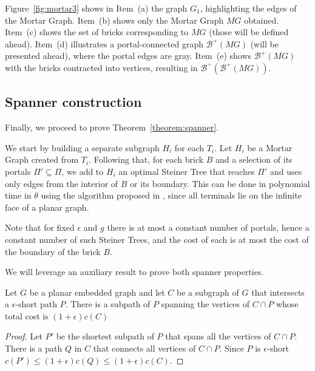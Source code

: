 Figure~\ref{fig:mortar3} shows in Item~(a) the graph \(G_1\), highlighting the edges of the Mortar Graph. 
Item~(b) shows only the Mortar Graph \(MG\) obtained. 
Item~(c) shows the set of bricks corresponding to \(MG\) (those will be defined ahead). 
Item~(d) illustrates a portal-connected graph \(\mathcal{B}^{+}(MG)\) (will be presented ahead), where the portal edges are gray. 
Item~(e) shows \(\mathcal{\mathcal{B}}^{+}(MG)\) with the bricks contracted into vertices, resulting in \(\mathcal{B}^{\div}(\mathcal{B }^{+}(MG))\).

\subsection{Spanner construction}

Finally, we proceed to prove Theorem~\ref{theorem:spanner}.

We start by building a separate subgraph \(H_i\) for each \(T_i\). Let \(H_i\) be a Mortar Graph created from \(T_i\). Following that, for each brick \(B\) and a selection of its portals \(\Pi' \subseteq \Pi\), we add to \(H_i\) an optimal Steiner Tree that reaches \(\Pi'\) and uses only edges from the interior of \(B\) or its boundary. This can be done in polynomial time in \(\theta\) using the algorithm proposed in \cite{ericksonST}, since all terminals lie on the infinite face of a planar graph.

Note that for fixed \(\epsilon\) and \(g\) there is at most a constant number of portals, hence a constant number of such Steiner Trees, and the cost of each is at most the cost of the boundary of the brick \(B\).

We will leverage an auxiliary result to prove both spanner properties.

\begin{flemma}\label{lemma:borradaile_10_1}
    Let \(G\) be a planar embedded graph and let \(C\) be a subgraph of \(G\) that intersects a \(\epsilon\)-short path \(P\). There is a subpath of \(P\) spanning the vertices of \(C \cap P\) whose total cost is \((1 + \epsilon) c(C)\)
\end{flemma}
\begin{proof}
    Let \(P'\) be the shortest subpath of \(P\) that spans all the vertices of \(C \cap P\). There is a path \(Q\) in \(C\) that connects all vertices of \(C \cap P\). Since \(P\) is \(\epsilon\)-short \(c(P') \leq (1 + \epsilon)c(Q) \leq (1 + \epsilon)c(C)\).
\end{proof}

